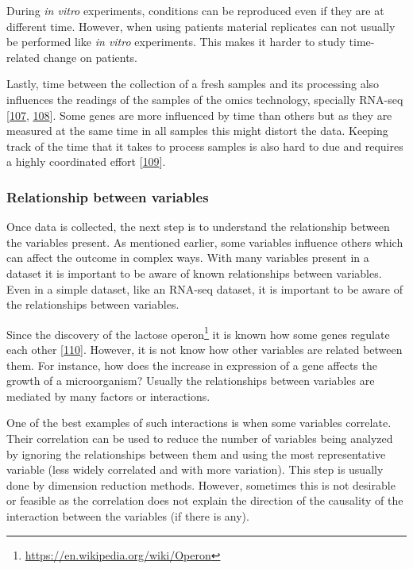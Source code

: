 \documentclass[
  a4paper,
]{book}
\DeclareRobustCommand{\href}[2]{#2\footnote{\url{#1}}}
\begin{document}
During \emph{in vitro} experiments, conditions can be reproduced even if they are at different time.
However, when using patients material replicates can not usually be performed like \emph{in vitro} experiments.
This makes it harder to study time-related change on patients.

Lastly, time between the collection of a fresh samples and its processing also influences the readings of the samples of the omics technology, specially RNA-seq {[}\protect\hyperlink{ref-massoni-badosa2020}{107}, \protect\hyperlink{ref-zhu2017}{108}{]}.
Some genes are more influenced by time than others but as they are measured at the same time in all samples this might distort the data.
Keeping track of the time that it takes to process samples is also hard to due and requires a highly coordinated effort {[}\protect\hyperlink{ref-ferreira2018}{109}{]}.

\hypertarget{relationship-between-variables}{%
\subsubsection{Relationship between variables}\label{relationship-between-variables}}

Once data is collected, the next step is to understand the relationship between the variables present.
As mentioned earlier, some variables influence others which can affect the outcome in complex ways.
With many variables present in a dataset it is important to be aware of known relationships between variables.
Even in a simple dataset, like an RNA-seq dataset, it is important to be aware of the relationships between variables.

Since the discovery of the lactose \href{https://en.wikipedia.org/wiki/Operon}{operon} it is known how some genes regulate each other {[}\protect\hyperlink{ref-jacob1961}{110}{]}.
However, it is not know how other variables are related between them.
For instance, how does the increase in expression of a gene affects the growth of a microorganism?
Usually the relationships between variables are mediated by many factors or interactions.

One of the best examples of such interactions is when some variables correlate.
Their correlation can be used to reduce the number of variables being analyzed by ignoring the relationships between them and using the most representative variable (less widely correlated and with more variation).
This step is usually done by dimension reduction methods.
However, sometimes this is not desirable or feasible as the correlation does not explain the direction of the causality of the interaction between the variables (if there is any).
\end{document}
